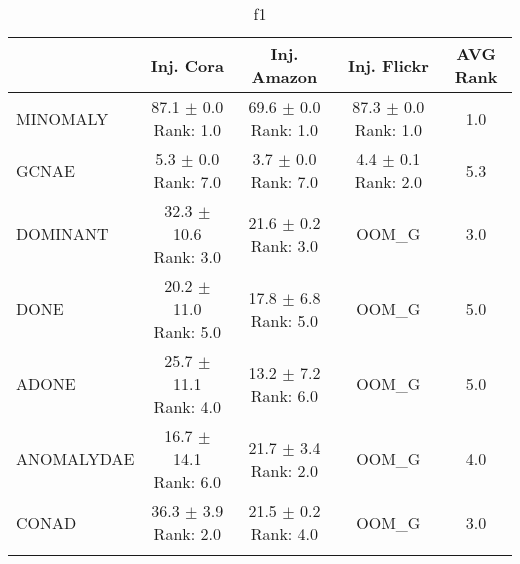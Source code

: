 \begin{longtable}{|l|c|c|c|c|}
\hline
 & Inj. Cora & Inj. Amazon & Inj. Flickr & AVG Rank \\ \hline
MINOMALY & \makecell{ 87.1 $\pm$ 0.0 \\ \tiny Rank: 1.0 } & \makecell{ 69.6 $\pm$ 0.0 \\ \tiny Rank: 1.0 } & \makecell{ 87.3 $\pm$ 0.0 \\ \tiny Rank: 1.0 } & 1.0 \\ \hline 
GCNAE & \makecell{ 5.3 $\pm$ 0.0 \\ \tiny Rank: 7.0 } & \makecell{ 3.7 $\pm$ 0.0 \\ \tiny Rank: 7.0 } & \makecell{ 4.4 $\pm$ 0.1 \\ \tiny Rank: 2.0 } & 5.3 \\ \hline 
DOMINANT & \makecell{ 32.3 $\pm$ 10.6 \\ \tiny Rank: 3.0 } & \makecell{ 21.6 $\pm$ 0.2 \\ \tiny Rank: 3.0 } & OOM\_G & 3.0 \\ \hline 
DONE & \makecell{ 20.2 $\pm$ 11.0 \\ \tiny Rank: 5.0 } & \makecell{ 17.8 $\pm$ 6.8 \\ \tiny Rank: 5.0 } & OOM\_G & 5.0 \\ \hline 
ADONE & \makecell{ 25.7 $\pm$ 11.1 \\ \tiny Rank: 4.0 } & \makecell{ 13.2 $\pm$ 7.2 \\ \tiny Rank: 6.0 } & OOM\_G & 5.0 \\ \hline 
ANOMALYDAE & \makecell{ 16.7 $\pm$ 14.1 \\ \tiny Rank: 6.0 } & \makecell{ 21.7 $\pm$ 3.4 \\ \tiny Rank: 2.0 } & OOM\_G & 4.0 \\ \hline 
CONAD & \makecell{ 36.3 $\pm$ 3.9 \\ \tiny Rank: 2.0 } & \makecell{ 21.5 $\pm$ 0.2 \\ \tiny Rank: 4.0 } & OOM\_G & 3.0 \\ \hline 
\caption{ f1 } \label{tab:f1}
\end{longtable}
